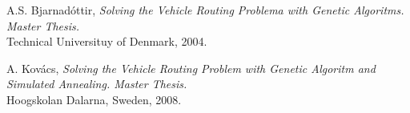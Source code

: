 \documentclass[conference]{IEEEtran}
\begin{document}
%
%
%
\begin{thebibliography}{1}

A.S. Bjarnadóttir, \emph{Solving the Vehicle Routing Problema with Genetic Algoritms.  Master Thesis.}\\
Technical Universituy of Denmark, 2004.

A. Kovács, \emph{Solving the Vehicle Routing Problem with Genetic Algoritm and Simulated Annealing. Master Thesis.}\\
Hoogskolan Dalarna, Sweden, 2008.

\end{thebibliography}




\end{document}
